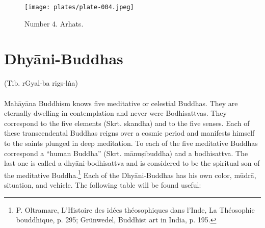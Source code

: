 \documentclass[a4paper, 12pt, oneside]{article}
\begin{document}
\clearpage
\vspace*{\fill}
\begin{figure}[H]
\centering
\texttt{[image: plates/plate-004.jpeg]}
\caption*{Number 4. Arhats.}
\end{figure}
\vspace*{\fill}
\clearpage
\section{Dhy\={a}ni-Buddhas}
\begin{center}
(Tib. rGyal-ba rigs-l\.{n}a)
\end{center}
\paragraph{}
Mah\={a}y\={a}na Buddhism knows five meditative or celestial Buddhas. They are eternally dwelling in contemplation and never were Bodhisattvas. They correspond to the five elements (Skrt. skandha) and to the five senses. Each of these transcendental Buddhas reigns over a cosmic period and manifests himself to the saints plunged in deep meditation. To each of the five meditative Buddhas correspond a ``human Buddha'' (Skrt. m\={a}nu\d{s}ibuddha) and a bodhisattva. The last one is called a dhy\={a}ni-bodhisattva and is considered to be the spiritual son of the meditative Buddha.\footnote{P. Oltramare, L'Histoire des idées théosophiques dans l'Inde, La Théosophie bouddhique, p. 295; Grünwedel, Buddhist art in India, p. 195.} Each of the Dhy\={a}ni-Buddhas has his own color, m\={u}dr\={a}, situation, and vehicle. The following table will be found useful:
\end{document}
